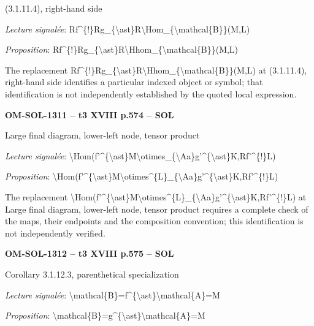 (3.1.11.4), right-hand side\par
\emph{Lecture signalée}: Rf\textasciicircum{}\{!\}Rg\_\{\textbackslash{}ast\}R\textbackslash{}Hom\_\{\textbackslash{}mathcal\{B\}\}(M,L)\par
\emph{Proposition}: Rf\textasciicircum{}\{!\}Rg\_\{\textbackslash{}ast\}R\textbackslash{}Hhom\_\{\textbackslash{}mathcal\{B\}\}(M,L)\par
The replacement Rf\textasciicircum{}\{!\}Rg\_\{\textbackslash{}ast\}R\textbackslash{}Hhom\_\{\textbackslash{}mathcal\{B\}\}(M,L) at (3.1.11.4), right-hand side identifies a particular indexed object or symbol; that identification is not independently established by the quoted local expression.\par
\par\noindent\textbf{OM-SOL-1311 -- t3 XVIII p.574 -- SOL}\par
Large final diagram, lower-left node, tensor product\par
\emph{Lecture signalée}: \textbackslash{}Hom(f'\textasciicircum{}\{\textbackslash{}ast\}M\textbackslash{}otimes\_\{\textbackslash{}Aa\}g'\textasciicircum{}\{\textbackslash{}ast\}K,Rf'\textasciicircum{}\{!\}L)\par
\emph{Proposition}: \textbackslash{}Hom(f'\textasciicircum{}\{\textbackslash{}ast\}M\textbackslash{}otimes\textasciicircum{}\{L\}\_\{\textbackslash{}Aa\}g'\textasciicircum{}\{\textbackslash{}ast\}K,Rf'\textasciicircum{}\{!\}L)\par
The replacement \textbackslash{}Hom(f'\textasciicircum{}\{\textbackslash{}ast\}M\textbackslash{}otimes\textasciicircum{}\{L\}\_\{\textbackslash{}Aa\}g'\textasciicircum{}\{\textbackslash{}ast\}K,Rf'\textasciicircum{}\{!\}L) at Large final diagram, lower-left node, tensor product requires a complete check of the maps, their endpoints and the composition convention; this identification is not independently verified.\par
\par\noindent\textbf{OM-SOL-1312 -- t3 XVIII p.575 -- SOL}\par
Corollary 3.1.12.3, parenthetical specialization\par
\emph{Lecture signalée}: \textbackslash{}mathcal\{B\}=\allowbreak f\textasciicircum{}\{\textbackslash{}ast\}\textbackslash{}mathcal\{A\}=\allowbreak M\par
\emph{Proposition}: \textbackslash{}mathcal\{B\}=\allowbreak g\textasciicircum{}\{\textbackslash{}ast\}\textbackslash{}mathcal\{A\}=\allowbreak M\par
